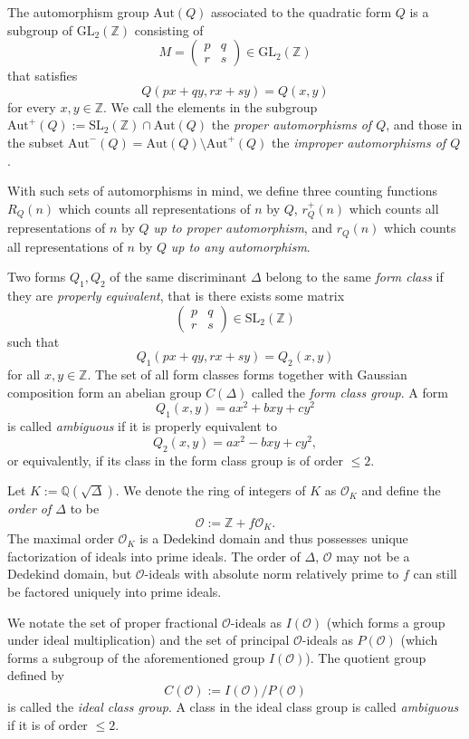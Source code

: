 \documentclass[11pt]{amsart}
\theoremstyle{definition}
\begin{document}
The automorphism group $\text{Aut}(Q)$ associated to the quadratic form $Q$ is a subgroup of $\text{GL}_2(\mathbb{Z})$ consisting of 
\[
M=\begin{pmatrix}
    p&q\\
    r&s
\end{pmatrix}\in\text{GL}_2(\mathbb{Z})
\]
that satisfies
\[
Q(px+qy,rx+sy)=Q(x,y)
\]
for every $x,y\in\mathbb{Z}$. We call the elements in the subgroup $\text{Aut}^+(Q):=\text{SL}_2(\mathbb{Z})\cap \text{Aut}(Q)$ the \textit{proper automorphisms of $Q$}, and those in the subset $\text{Aut}^{-}(Q)=\text{Aut}(Q)\setminus \text{Aut}^+(Q)$ the \textit{improper automorphisms of $Q$}.

With such sets of automorphisms in mind, we define three counting functions $R_Q(n)$ which counts all representations of $n$ by $Q$, $r^+_Q(n)$ which counts all representations of $n$ by $Q$ \textit{up to proper automorphism}, and $r_Q(n)$ which counts all representations of $n$ by $Q$ \textit{up to any automorphism}.

Two forms $Q_1,Q_2$ of the same discriminant $\Delta$ belong to the same \textit{form class} if they are \textit{properly equivalent}, that is there exists some matrix 
\[
\begin{pmatrix}
    p&q\\
    r&s
\end{pmatrix}\in\text{SL}_2(\mathbb{Z})
\]
such that
\[
Q_1(px+qy,rx+sy)=Q_2(x,y)
\]
for all $x,y\in\mathbb{Z}$. The set of all form classes forms together with Gaussian composition form an abelian group $C(\Delta)$ called the \textit{form class group}. A form
\[
Q_1(x, y)=ax^2+bxy+cy^2
\]
is called \textit{ambiguous} if it is properly equivalent to 
\[
Q_2(x, y)=ax^2-bxy+cy^2,
\]
or equivalently, if its class in the form class group is of order $\leq 2$.

Let $K:=\mathbb{Q}(\sqrt{\Delta})$. We denote the ring of integers of $K$ as $\mathcal{O}_K$ and define the \textit{order of $\Delta$} to be
\[
\mathcal{O}:=\mathbb{Z}+f\mathcal{O}_K.
\]
The maximal order $\mathcal{O}_K$ is a Dedekind domain and thus possesses unique factorization of ideals into prime ideals. The order of $\Delta$, $\mathcal{O}$ may not be a Dedekind domain, but $\mathcal{O}$-ideals with absolute norm relatively prime to $f$ can still be factored uniquely into prime ideals.

We notate the set of proper fractional $\mathcal{O}$-ideals as $I(\mathcal{O})$ (which forms a group under ideal multiplication) and the set of principal $\mathcal{O}$-ideals as $P(\mathcal{O})$ (which forms a subgroup of the aforementioned group $I(\mathcal{O})$). The quotient group defined by 
\[C(\mathcal{O}):=I(\mathcal{O})/P(\mathcal{O})
\]
is called the \textit{ideal class group}. A class in the ideal class group is called \textit{ambiguous} if it is of order $\leq 2$.
\end{document}
